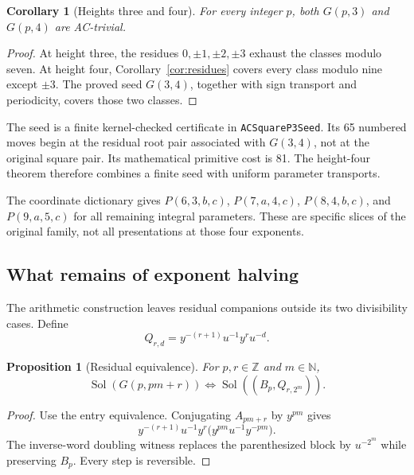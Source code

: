 \documentclass[11pt]{article}
\newtheorem{corollary}[theorem]{Corollary}
\newtheorem{proposition}[theorem]{Proposition}
\theoremstyle{definition}\newtheorem{definition}[theorem]{Definition}
\theoremstyle{remark}\newtheorem{remark}[theorem]{Remark}
\newcommand{\Sol}{\operatorname{Sol}}
\begin{document}
\begin{corollary}[Heights three and four]\label{cor:heights}
For every integer $p$, both $G(p,3)$ and $G(p,4)$ are AC-trivial.
\end{corollary}
\begin{proof}
At height three, the residues $0,\pm1,\pm2,\pm3$ exhaust the classes modulo seven. At height four, Corollary~\ref{cor:residues} covers every class modulo nine except $\pm3$. The proved seed $G(3,4)$, together with sign transport and periodicity, covers those two classes.
\end{proof}
The seed is a finite kernel-checked certificate in \texttt{ACSquareP3Seed}. Its 65 numbered moves begin at the residual root pair associated with $G(3,4)$, not at the original square pair. Its mathematical primitive cost is 81. The height-four theorem therefore combines a finite seed with uniform parameter transports.

The coordinate dictionary gives $P(6,3,b,c)$, $P(7,a,4,c)$, $P(8,4,b,c)$, and $P(9,a,5,c)$ for all remaining integral parameters. These are specific slices of the original family, not all presentations at those four exponents.

\subsection{What remains of exponent halving}
The arithmetic construction leaves residual companions outside its two divisibility cases. Define
\[
Q_{r,d}=y^{-(r+1)}u^{-1}y^ru^{-d}.
\]
\begin{proposition}[Residual equivalence]\label{prop:residual}
For $p,r\in\mathbb Z$ and $m\in\mathbb N$,
\[
\Sol(G(p,pm+r))\iff\Sol((B_p,Q_{r,2^m})).
\]
\end{proposition}
\begin{proof}
Use the entry equivalence. Conjugating $A_{pm+r}$ by $y^{pm}$ gives
\[
y^{-(r+1)}u^{-1}y^r\bigl(y^{pm}u^{-1}y^{-pm}\bigr).
\]
The inverse-word doubling witness replaces the parenthesized block by $u^{-2^m}$ while preserving $B_p$. Every step is reversible.
\end{proof}
\end{document}
